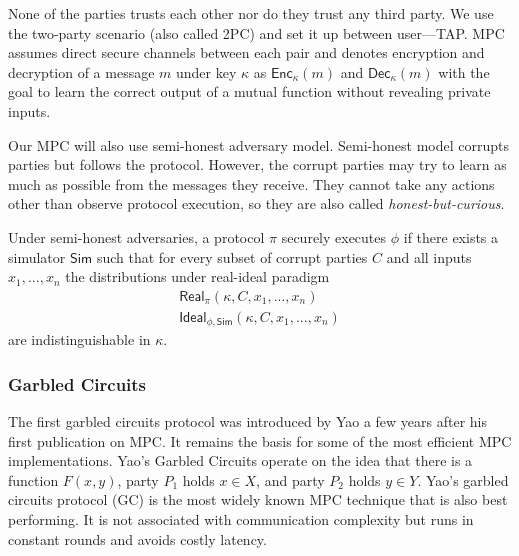 None of the parties trusts each other nor do they trust any third party. We use the two-party scenario
(also called 2PC) and set it up between user---TAP. MPC assumes direct secure channels between each
pair and denotes encryption and decryption of a message $m$ under key
$\kappa$ as $\mathsf{Enc}_\kappa(m)$ and $\mathsf{Dec}_\kappa(m)$ with the goal to learn the correct
output of a mutual function without revealing private inputs. 

Our MPC will also use semi-honest adversary model. Semi-honest model corrupts parties but follows
the protocol. However, the corrupt parties may try to learn as much as possible from the messages they
receive. They cannot take any actions other than observe protocol execution, so they are also called
\emph{honest-but-curious}. 

Under semi-honest adversaries, a protocol $\pi$ securely executes $\phi$ if there exists a simulator 
$\mathsf{Sim}$ such that for every subset of corrupt parties $C$ and all inputs $x_1, ..., x_n$ the
distributions under real-ideal paradigm 
\begin{gather*}
  \mathsf{Real}_{\pi}(\kappa, C, x_1, ..., x_n) \\
  \mathsf{Ideal}_{\phi, \mathsf{Sim}} (\kappa, C, x_1, ..., x_n)
\end{gather*} 
are indistinguishable in $\kappa$.


\subsubsection{Garbled Circuits}

The first garbled circuits protocol was introduced by Yao a few years after his first publication on MPC. It
remains the basis for some of the most efficient MPC implementations. Yao's Garbled Circuits operate on
the idea that there is a function $F(x,y)$, party $P_1$ holds $x \in X$, and party $P_2$ holds $y \in Y$.
Yao's garbled circuits protocol (GC) is the most widely known MPC technique that is also best
performing. It is not associated with communication complexity but runs in constant rounds and avoids
costly latency. 








